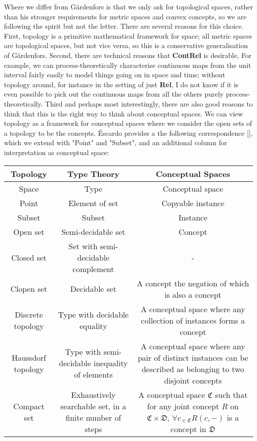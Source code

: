 \begin{fullwidth}
Where we differ from G\"{a}rdenfors is that we only ask for topological spaces, rather than his stronger requirements for metric spaces and convex concepts, so we are following the spirit but not the letter. There are several reasons for this choice. First, topology is a primitive mathematical framework for space; all metric spaces are topological spaces, but not vice versa, so this is a conservative generalisation of G\"{a}rdenfors. Second, there are technical reasons that \textbf{ContRel} is desirable, For example, we can process-theoretically characterise continuous maps from the unit interval fairly easily to model things going on in space and time; without topology around, for instance in the setting of just \textbf{Rel}, I do not know if it is even possible to pick out the continuous maps from all the others purely process-theoretically. Third and perhaps most interestingly, there are also good reasons to think that this is the right way to think about conceptual spaces. We can view topology as a framework for conceptual spaces where we consider the open sets of a topology to be the concepts. \'{E}scardo provides a the following correspondence [], which we extend with "Point" and "Subset", and an additional column for interpretation as conceptual space:

\begin{table}[h]
\begin{tabular}{|c|c|c|}
\hline
\textbf{Topology} & \textbf{Type Theory} & \textbf{Conceptual Spaces}  \\ \hline
Space & Type & Conceptual space \\  \hline
Point & Element of set & Copyable instance \\  \hline
Subset & Subset & Instance \\  \hline
Open set & Semi-decidable set & Concept \\ \hline
Closed set & Set with semi-decidable complement & - \\ \hline
Clopen set & Decidable set & A concept the negation of which is also a concept \\ \hline
Discrete topology & Type with decidable equality & A conceptual space where any collection of instances forms a concept \\ \hline
Haussdorf topology & Type with semi-decidable inequality of elements & A conceptual space where any pair of distinct instances can be described as belonging to two disjoint concepts \\ \hline
Compact set & Exhaustively searchable set, in a finite number of steps & A conceptual space $\mathfrak{C}$ such that for any joint concept $R$ on $\mathfrak{C} \times \mathfrak{D}$, $\forall c_{ \in \mathfrak{C}}R(c, - )$ is a concept in $\mathfrak{D}$ \\ \hline
\end{tabular}
\end{table}


\end{fullwidth}
